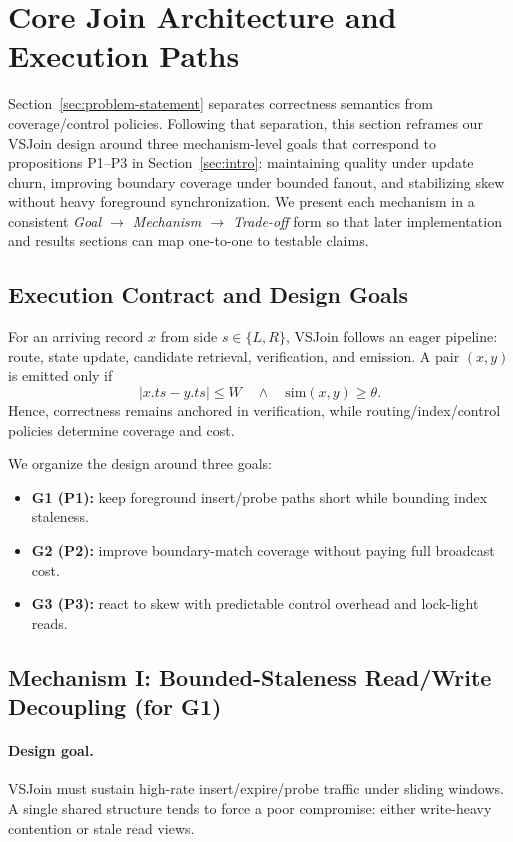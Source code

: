 \section{Core Join Architecture and Execution Paths}
\label{sec:core-architecture}

Section~\ref{sec:problem-statement} separates correctness semantics from coverage/control policies. Following that separation, this section reframes our VSJoin design around three mechanism-level goals that correspond to propositions P1--P3 in Section~\ref{sec:intro}: maintaining quality under update churn, improving boundary coverage under bounded fanout, and stabilizing skew without heavy foreground synchronization. We present each mechanism in a consistent \textit{Goal $\rightarrow$ Mechanism $\rightarrow$ Trade-off} form so that later implementation and results sections can map one-to-one to testable claims.

\subsection{Execution Contract and Design Goals}

For an arriving record $x$ from side $s \in \{L,R\}$, VSJoin follows an eager pipeline: route, state update, candidate retrieval, verification, and emission. A pair $(x,y)$ is emitted only if
\[
|x.\mathit{ts} - y.\mathit{ts}| \le W \quad \land \quad \mathrm{sim}(x,y) \ge \theta.
\]
Hence, correctness remains anchored in verification, while routing/index/control policies determine coverage and cost.

We organize the design around three goals:
\begin{itemize}
    \item \textbf{G1 (P1):} keep foreground insert/probe paths short while bounding index staleness.
    \item \textbf{G2 (P2):} improve boundary-match coverage without paying full broadcast cost.
    \item \textbf{G3 (P3):} react to skew with predictable control overhead and lock-light reads.
\end{itemize}

\subsection{Mechanism I: Bounded-Staleness Read/Write Decoupling (for G1)}

\paragraph{Design goal.}
VSJoin must sustain high-rate insert/expire/probe traffic under sliding windows. A single shared structure tends to force a poor compromise: either write-heavy contention or stale read views.

